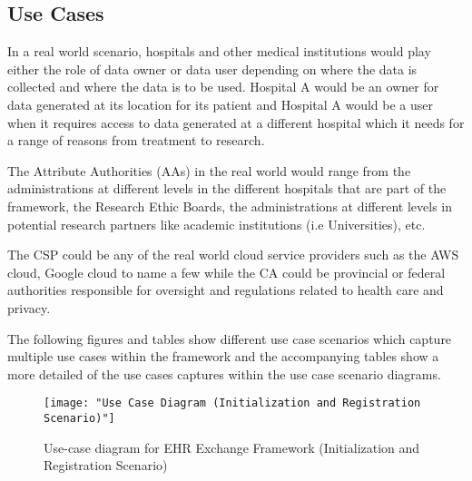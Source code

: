 \subsection{Use Cases}

In a real world scenario, hospitals and other medical institutions would play either the role of data owner or data user depending on where the data is collected and where the data is to be used. Hospital A would be an owner for data generated at its location for its patient and Hospital A would be a user when it requires access to data generated at a different hospital which it needs for a range of reasons from treatment to research.

The Attribute Authorities (AAs) in the real world would range from the administrations at different levels in the different hospitals that are part of the framework, the Research Ethic Boards, the administrations at different levels in potential research partners like academic institutions (i.e Universities), etc.

The CSP could be any of the real world cloud service providers such as the AWS cloud, Google cloud to name a few while the CA could be provincial or federal authorities responsible for oversight and regulations related to health care and privacy.

The following figures and tables show different use case scenarios which capture multiple use cases within the framework and the accompanying tables show a more detailed of the use cases captures within the use case scenario diagrams.



\begin{figure}[]
	\centering
	\texttt{[image: "Use Case Diagram (Initialization and Registration Scenario)"]}
	\caption{Use-case diagram for EHR Exchange Framework (Initialization and Registration Scenario)}
	\label{fig:use_case_ini}
\end{figure}

